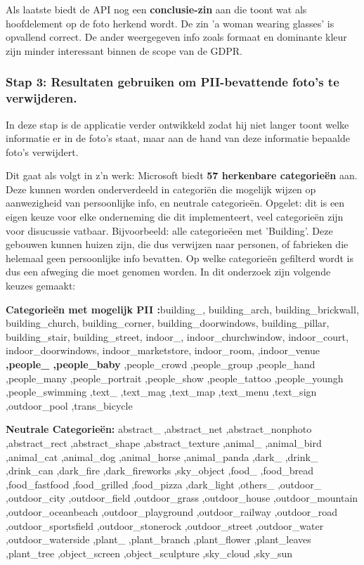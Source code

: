 Als laatste biedt de API nog een \textbf{conclusie-zin} aan die toont wat als hoofdelement op de foto herkend wordt. De zin 'a woman wearing glasses' is opvallend correct. 
De ander weergegeven info zoals formaat en dominante kleur zijn minder interessant binnen de scope van de GDPR.

\subsubsection{Stap 3: Resultaten gebruiken om PII-bevattende foto's te verwijderen.}
In deze stap is de applicatie verder ontwikkeld zodat hij niet langer toont welke informatie er in de foto's staat, maar aan de hand van deze informatie bepaalde foto's verwijdert. 

Dit gaat als volgt in z'n werk: Microsoft biedt \textbf{57 herkenbare categorieën} aan. Deze kunnen worden onderverdeeld in categoriën die mogelijk wijzen op aanwezigheid van persoonlijke info, en neutrale categorieën. Opgelet: dit is een eigen keuze voor elke onderneming die dit implementeert, veel categorieën zijn voor disucussie vatbaar. Bijvoorbeeld: alle categorieëen met 'Building'. Deze gebouwen kunnen huizen zijn, die dus verwijzen naar personen, of fabrieken die helemaal geen persoonlijke info bevatten. Op welke categorieën gefilterd wordt is dus een afweging die moet genomen worden. 
In dit onderzoek zijn volgende keuzes gemaakt: 

\textbf{Categorieën met mogelijk PII :}building\_, building\_arch, building\_brickwall, building\_church, building\_corner, building\_doorwindows, building\_pillar, building\_stair, building\_street, indoor\_, indoor\_churchwindow, indoor\_court, indoor\_doorwindows, indoor\_marketstore,
indoor\_room, 
,indoor\_venue \textbf{,people\_ ,people\_baby}
,people\_crowd
,people\_group
,people\_hand
,people\_many
,people\_portrait
,people\_show
,people\_tattoo
,people\_youngh
,people\_swimming
,text\_
,text\_mag
,text\_map
,text\_menu
,text\_sign
,outdoor\_pool ,trans\_bicycle

\textbf{Neutrale Categorieën:} abstract\_
,abstract\_net
,abstract\_nonphoto
,abstract\_rect
,abstract\_shape
,abstract\_texture
,animal\_
,animal\_bird
,animal\_cat
,animal\_dog
,animal\_horse
,animal\_panda
,dark\_
,drink\_
,drink\_can
,dark\_fire
,dark\_fireworks
,sky\_object
,food\_
,food\_bread
,food\_fastfood
,food\_grilled
,food\_pizza
,dark\_light
,others\_
,outdoor\_
,outdoor\_city
,outdoor\_field
,outdoor\_grass
,outdoor\_house
,outdoor\_mountain
,outdoor\_oceanbeach
,outdoor\_playground
,outdoor\_railway
,outdoor\_road
,outdoor\_sportsfield
,outdoor\_stonerock
,outdoor\_street
,outdoor\_water
,outdoor\_waterside
,plant\_
,plant\_branch
,plant\_flower
,plant\_leaves
,plant\_tree
,object\_screen
,object\_sculpture
,sky\_cloud
,sky\_sun

